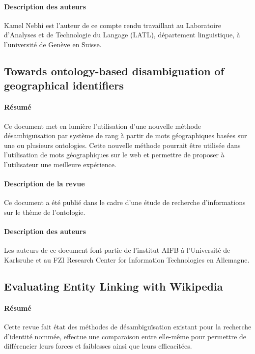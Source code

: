 \documentclass{article}
\begin{document}
\paragraph{Description des auteurs}

Kamel Nebhi est l'auteur de ce compte rendu travaillant au Laboratoire d'Analyses et de Technologie du Langage (LATL), département linguistique, à l'université de Genève en Suisse.

\subsection{Towards ontology-based disambiguation of geographical identifiers\cite{article-3}}


\paragraph{Résumé}
Ce document met en lumière l'utilisation d'une nouvelle méthode désambiguïsation par système de rang à partir de mots géographiques basées sur une ou plusieurs ontologies. Cette nouvelle méthode pourrait être utilisée dans l'utilisation de mots géographiques sur le web et permettre de proposer à l'utilisateur une meilleure expérience. 

\paragraph{Description de la revue}
Ce document a été publié dans le cadre d'une étude de recherche d'informations sur le thème de l'ontologie.

\paragraph{Description des auteurs}

Les auteurs de ce document font partie de l'institut AIFB à l'Université de Karlsruhe et au FZI Research Center for Information Technologies en Allemagne.

\subsection{Evaluating Entity Linking with Wikipedia\cite{article-7}}

\paragraph{Résumé}
Cette revue fait état des méthodes de désambiguïsation existant pour la recherche d'identité nommée, effectue une comparaison entre elle-même pour permettre de différencier leurs forces et faiblesses ainsi que leurs efficacitées.
\end{document}
